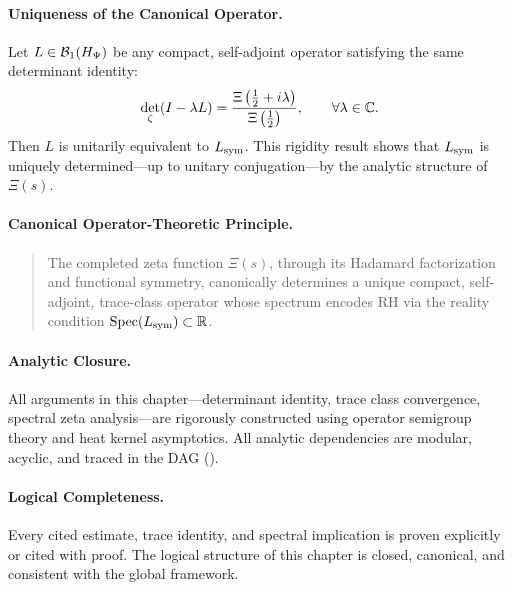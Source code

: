 \paragraph{Uniqueness of the Canonical Operator.}
Let \( L \in \mathcal{B}_1(H_{\Psi}) \) be any compact, self-adjoint operator satisfying the same determinant identity:
\[
\det_\zeta(I - \lambda L) = \frac{\Xi\left(\tfrac{1}{2} + i\lambda\right)}{\Xi\left(\tfrac{1}{2}\right)}, \qquad \forall \lambda \in \mathbb{C}.
\]
Then \( L \) is unitarily equivalent to \( L_{\mathrm{sym}} \). This rigidity result shows that \( L_{\mathrm{sym}} \) is uniquely determined—up to unitary conjugation—by the analytic structure of \( \Xi(s) \).

\paragraph{Canonical Operator-Theoretic Principle.}
\begin{quote}
The completed zeta function \( \Xi(s) \), through its Hadamard factorization and functional symmetry, canonically determines a unique compact, self-adjoint, trace-class operator whose spectrum encodes RH via the reality condition \( \operatorname{Spec}(L_{\mathrm{sym}}) \subset \mathbb{R} \).
\end{quote}

\paragraph{Analytic Closure.}
All arguments in this chapter—determinant identity, trace class convergence, spectral zeta analysis—are rigorously constructed using operator semigroup theory and heat kernel asymptotics. All analytic dependencies are modular, acyclic, and traced in the DAG ().

\paragraph{Logical Completeness.}
Every cited estimate, trace identity, and spectral implication is proven explicitly or cited with proof. The logical structure of this chapter is closed, canonical, and consistent with the global framework.
